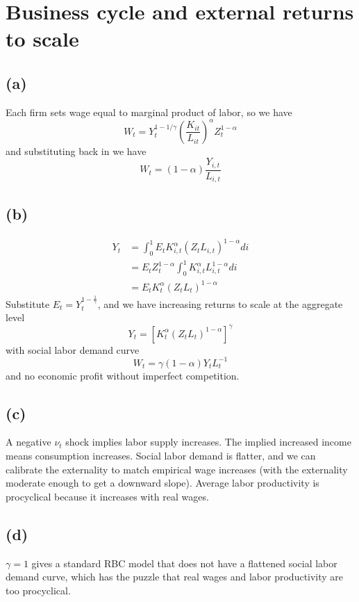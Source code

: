 \documentclass[12pt]{article}
\begin{document}
\section{Business cycle and external returns to scale}

\subsection*{(a)}

Each firm sets wage equal to marginal product of labor, so we have
\[
W_t = Y_t^{1-1/\gamma} \left(\frac{K_{it}}{L_{it}}\right)^{\alpha} Z_t^{1-\alpha}
\]
and substituting back in we have
\[
W _ { t } = ( 1- \alpha ) \frac{Y_{i,t}}{L_{i,t}}
\]
\subsection*{(b)}

\begin{align*}
	Y_t &= \int_{0}^{1} E_t K_{i,t}^\alpha \left( Z_t L_{i,t} \right)^{1-\alpha} di \\
	& = E_t Z_t^{1-\alpha} \int_{0}^{1} K_{i,t}^\alpha  L_{i,t}^{1-\alpha} di \\
	& = E_t K_t^\alpha (Z_t L_t)^{1-\alpha}
	\end{align*}
	Substitute $E_t = Y_t^{1- \frac{1}{\gamma}}$, and we have increasing returns to scale at the aggregate level
	\begin{equation*}
	Y _ { t } = \left[ K _ { t } ^ { \alpha } \left( Z _ { t } L _ { t } \right) ^ { 1- \alpha } \right] ^ { \gamma }
	\end{equation*}
	with social labor demand curve
	\[
	W _ { t } = \gamma ( 1- \alpha ) Y _ { t } L _ { t } ^ { - 1}
	\] and no economic profit without imperfect competition. 

\subsection*{(c)}
A negative $\nu_t$ shock implies labor supply increases. 
The implied increased income means consumption increases. 
Social labor demand is flatter, and we can calibrate the externality to match empirical wage increases (with the externality moderate enough to get a downward slope).
Average labor productivity is procyclical because it increases with real wages. 

\subsection*{(d)}
 $\gamma = 1$ gives a standard RBC model that does not have a flattened social labor demand curve, which has the puzzle that real wages and labor productivity are too procyclical. 
 
\end{document}
